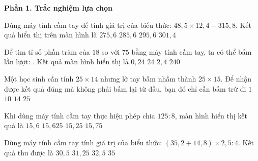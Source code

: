 \textbf{Phần 1. Trắc nghiệm lựa chọn}

\begin{ex} %
Dùng máy tính cầm tay để tính giá trị của biểu thức: $48{,}5 \times 12{,}4 - 315{,}8$. Kết quả hiển thị trên màn hình là
\choice
{$275{,}6$}
{\True $285{,}6$}
{$295{,}6$}
{$301{,}4$}
\end{ex}

\begin{ex} %
Để tìm tỉ số phần trăm của $18$ so với $75$ bằng máy tính cầm tay, ta có thể bấm lần lượt:   \fbox{$\div$}   \fbox{\%}. Kết quả màn hình hiển thị là
\choice
{$0{,}24$}
{\True $24$}
{$2{,}4$}
{$240$}
\end{ex}

\begin{ex} %
Một học sinh cần tính $25 \times 14$ nhưng lỡ tay bấm nhầm thành $25 \times 15$. Để nhận được kết quả đúng mà không phải bấm lại từ đầu, bạn đó chỉ cần bấm trừ đi
\choice
{$1$}
{$10$}
{$14$}
{\True $25$}
\end{ex}

\begin{ex} %
Khi dùng máy tính cầm tay thực hiện phép chia $125 : 8$, màn hình hiển thị kết quả là
\choice
{$15{,}6$}
{\True $15{,}625$}
{$15{,}25$}
{$15{,}75$}
\end{ex}

\begin{ex} %
Dùng máy tính cầm tay tính giá trị của biểu thức: $(35{,}2 + 14{,}8) \times 2{,}5 : 4$. Kết quả thu được là
\choice
{$30{,}5$}
{\True $31{,}25$}
{$32{,}5$}
{$35$}
\end{ex}

